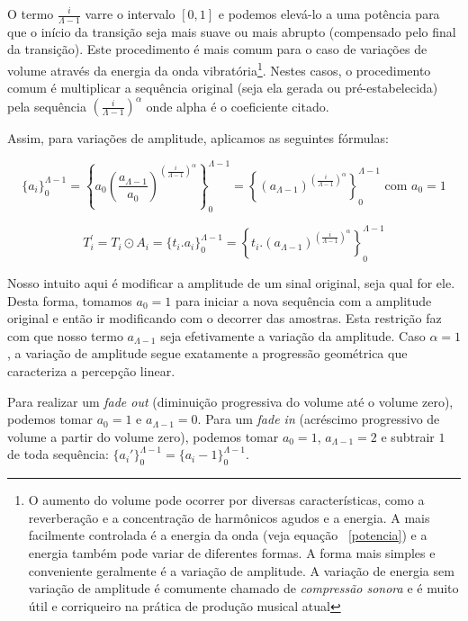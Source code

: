 O termo $\frac{i}{\Lambda-1}$ varre o intervalo $[0,1]$ e podemos elevá-lo a uma potência
para que o início da transição seja mais suave ou mais abrupto (compensado pelo final
da transição). Este procedimento é mais comum para o caso de variações de volume através da energia
da onda vibratória\footnote{O aumento do volume pode ocorrer por diversas características, como
a reverberação e a concentração de harmônicos agudos e a energia. A mais facilmente controlada
é a energia da onda (veja equação ~\ref{potencia}) e a energia também pode variar de diferentes formas. A forma mais
simples e conveniente geralmente é a variação de amplitude. A variação de energia sem variação de
amplitude é comumente chamado de \emph{compressão sonora} e é muito útil e corriqueiro na prática
de produção musical atual}. Nestes casos, o procedimento comum é multiplicar a sequência original
(seja ela gerada ou pré-estabelecida) pela sequência $\left ( \frac{i}{\Lambda-1} \right )^\alpha$
onde alpha é o coeficiente citado.

Assim, para variações de amplitude, aplicamos as seguintes fórmulas:

\begin{equation}
\{a_i\}_0^{\Lambda-1}=\left \{ a_0 \left ( \frac{a_{\Lambda-1}}{a_0} \right )^{\left ( \frac{i}{\Lambda-1} \right )^\alpha} \right \}_0^{\Lambda-1}=\left \{ \left ( {a_{\Lambda-1}} \right )^{\left ( \frac{i}{\Lambda-1} \right )^\alpha} \right \}_0^{\Lambda-1} \text{ com } a_0=1
\end{equation}

\begin{equation}\label{transAmp}
T_i^{'}=T_i \odot A_i = \{t_i . a_i\}_0^{\Lambda-1}=\left \{ t_i . (a_{\Lambda-1} )^{\left ( \frac{i}{\Lambda-1} \right )^\alpha} \right \}_0^{\Lambda-1}
\end{equation}

Nosso intuito aqui é modificar a amplitude de um sinal original, seja qual for ele. Desta forma, tomamos
$a_0=1$ para iniciar a nova sequência com a amplitude original e então ir modificando com o decorrer das amostras.
Esta restrição faz com que nosso termo $a_{\Lambda-1}$ seja efetivamente a variação da amplitude.
Caso $\alpha=1$, a variação de amplitude segue exatamente a progressão geométrica que caracteriza
a percepção linear.

Para realizar um \emph{fade out} (diminuição progressiva do volume até o volume zero),
podemos tomar $a_0=1$ e $a_{\Lambda-1}=0$. Para um \emph{fade in} (acréscimo progressivo de volume a partir do volume zero), podemos
tomar $a_0=1$, $a_{\Lambda-1}=2$ e subtrair $1$ de toda sequência: $\{a_i'\}_0^{\Lambda-1}=\{a_i-1\}_0^{\Lambda-1}$.

